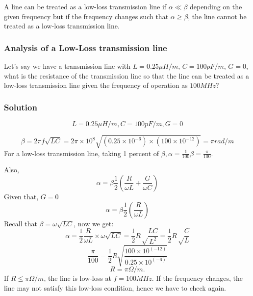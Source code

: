 A line can be treated as a low-loss transmission line if $\alpha \ll \beta$ depending on the given frequency but if the frequency changes such that $\alpha \geq \beta$, the line cannot be treated as a low-loss transmission line.

\begin{exmp}
\subsubsection*{Analysis of a Low-Loss transmission line}\label{lec:lec5}
Let's say we have a transmission line with $L = 0.25\mu H/m$, ${C= 100pF/m}$, $G = 0$, what is the resistance of the transmission line so that the line can be treated as a low-loss transmission line given the frequency of operation as $100MHz$?

\subsubsection*{Solution}
\[L= 0.25\mu H/m, C= 100pF/m, G = 0\]

\begin{dmath*}
\beta = 2\pi f\sqrt{LC}
=2 \pi \times 10^8 \sqrt{(0.25 \times 10^{-6}) \times (100 \times 10^{-12})} = \pi rad/m
\end{dmath*}
For a low-loss transmission line, taking 1 percent of $\beta,
\alpha= \frac{1}{100}\beta = \frac{\pi}{100}$.

Also,
\begin{equation*}
\alpha = \beta\frac{1}{2} \left(\frac{R}{\omega L} + \frac{G}{\omega C}\right)
\end{equation*}
Given that, \(G=0\)
\begin{equation*}
\alpha = \beta\frac{1}{2} \left(\frac{R}{\omega L}\right)
\end{equation*}
Recall that $\beta = \omega\sqrt{LC} $, now we get:
\begin{dmath*}
\alpha = \frac{1}{2}\frac{R}{\omega L} \times \omega\sqrt{LC} = \frac{1}{2} R \sqrt \frac{LC}{L^{2}} = \frac{1}{2} R \sqrt \frac{C}{L}
\end{dmath*}
\begin{equation*}
\frac{\pi}{100} = \frac{1}{2} R \sqrt{\frac{100 \times 10^{(-12)}}{0.25 \times 10^{(-6)}}}
\end{equation*}
\begin{equation*}
R=\pi\Omega/m.
\end{equation*}
If $R \leq \pi\Omega/m$, the line is low-loss at $ f= 100MHz$. If the frequency changes, the line may not satisfy this low-loss condition, hence we have to check again.
\end{exmp}

